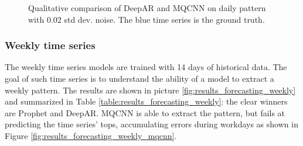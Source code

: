 \documentclass[a4paper, 12pt]{article} %
\begin{document}
	\begin{figure}\centering
		 \hfill
		
		\caption{Qualitative comparison of DeepAR and MQCNN on daily pattern with 0.02 std dev. noise. The blue time series is the ground truth.}
		\label{fig:results_forecasting_daily_02_mqcnn_deepar}
	\end{figure}
	
	\clearpage
	\subsubsection{Weekly time series} \label{sssec:results_forecasting_weekly}
	The weekly time series models are trained with 14 days of historical data. The goal of such time series is to understand the ability of a model to extract a weekly pattern.
	 The results are shown in picture \ref{fig:results_forecasting_weekly} and summarized in Table \ref{table:results_forecasting_weekly}: the clear winners are Prophet and DeepAR. MQCNN is able to extract the pattern, but fails at predicting the time series' tops, accumulating errors during workdays as shown in Figure \ref{fig:results_forecasting_weekly_mqcnn}.
	
\end{document}
